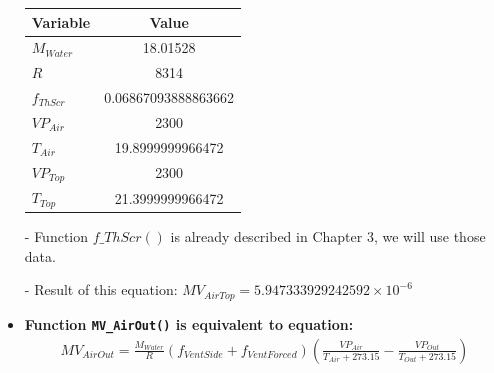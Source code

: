 \documentclass[a4paper]{article}
\numberwithin{equation}{section}
\begin{document}
\begin{itemize}
        \begin{table}[H]
          \centering
          \begin{tabular}{@{}lS[table-format=4.17]@{}}
            \toprule
            \textbf{Variable} & \textbf{Value}      \\
            \midrule
            \( M_{Water} \)     & 18.01528            \\
            \( R \)             & 8314                \\
            \( f_{ThScr} \)     & 0.06867093888863662 \\
            \( VP_{Air} \)      & 2300                \\
            \( T_{Air} \)       & 19.8999999966472    \\
            \( VP_{Top} \)      & 2300                \\
            \( T_{Top} \)       & 21.3999999966472    \\
            \bottomrule
          \end{tabular}
        \end{table}

  \item [-] Function \hyperref[fThScr]{\underline{\( f\_ThScr() \)}} is already described in Chapter 3, we will use those data.
  \item[-] Result of this equation: \( MV_{AirTop} = 5.947333929242592 \times 10^{-6} \)

  \item \textbf{Function \texttt{MV\_AirOut()} is equivalent to equation:}
        \begin{align*}
          MV_{AirOut}  = \frac{M_{Water}}{R} (f_{VentSide} + f_{VentForced}) (\frac{VP_{Air}}{T_{Air} + 273.15} - \frac{VP_{Out}}{T_{Out} + 273.15})
        \end{align*}


\end{itemize}
\end{document}
